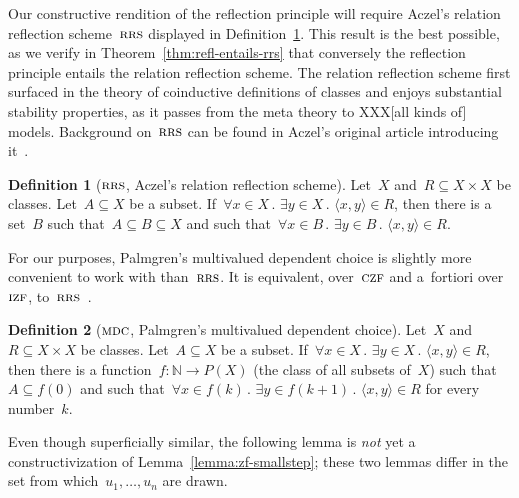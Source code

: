 \documentclass[oneside,reqno]{amsart}
\theoremstyle{definition}
\newtheorem{defn}{Definition}[section]
\theoremstyle{plain}
\theoremstyle{remark}
\newcommand{\NN}{\mathbb{N}}
\renewcommand{\_}{\mathpunct{.}\,}
\newcommand{\?}{\,{:}\,}
\newcommand{\IZF}{\textsc{izf}}
\newcommand{\CZF}{\textsc{czf}}
\newcommand{\RRS}{\textsc{rrs}}
\newcommand{\MDC}{\textsc{mdc}}
\begin{document}
Our constructive rendition of the reflection principle will require Aczel's
relation reflection scheme~$\RRS$ displayed in Definition~\ref{defn:rrs}. This
result is the best possible, as we verify in Theorem~\ref{thm:refl-entails-rrs}
that conversely the reflection principle entails the
relation reflection scheme. The relation reflection scheme first surfaced in
the theory of coinductive definitions of classes and enjoys substantial
stability properties, as it passes from the meta theory to XXX[all kinds of]
models. Background on~$\RRS$ can be found in Aczel's original article
introducing it~\cite{aczel:rrs}.

\begin{defn}[$\RRS$, Aczel's relation reflection scheme]\label{defn:rrs}
Let~$X$ and~$R \subseteq X \times X$ be classes. Let~$A \subseteq X$ be a
subset. If~$\forall x \in X\_ \exists y \in X\_ \langle x,y \rangle \in R$,
then there is a set~$B$ such that~$A \subseteq B \subseteq X$ and such
that~$\forall x \in B\_ \exists y \in B\_ \langle x,y \rangle \in R$.
\end{defn}

For our purposes, Palmgren's multivalued dependent choice is slightly more
convenient to work with than~$\RRS$. It is equivalent, over~$\CZF$ and
a~fortiori over~$\IZF$, to~$\RRS$~\cite{palmgren:mdc}.

\begin{defn}[$\MDC$, Palmgren's multivalued dependent choice]
Let~$X$ and~$R \subseteq X \times X$ be classes. Let~$A \subseteq X$ be a
subset. If~$\forall x \in X\_ \exists y \in X\_ \langle x,y \rangle \in R$,
then there is a function~$f : \NN \to P(X)$ (the class of all subsets of~$X$)
such that~$A \subseteq f(0)$ and such that~$\forall x \in f(k)\_ \exists y \in
f(k+1)\_ \langle x,y \rangle \in R$ for every number~$k$.\end{defn}

Even though superficially similar, the following lemma is \emph{not} yet a
constructivization of Lemma~\ref{lemma:zf-smallstep}; these two lemmas differ
in the set from which~$u_1,\ldots,u_n$ are drawn.
\end{document}
